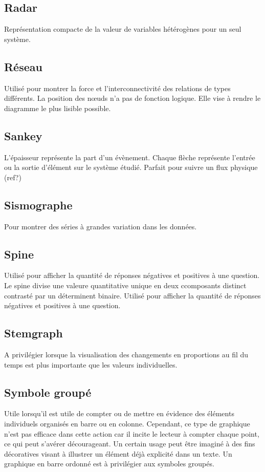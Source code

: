 \documentclass[a4paper,12pt]{article}
\begin{document}
\begin{multicols}{2}
\subsection*{Radar}
\label{sec:orgca13434}
Représentation compacte de la valeur de variables hétérogènes pour un seul système. \autocite{alansmithLexiqueVisuel}
\subsection*{Réseau}
\label{sec:org9e2b3ec}
Utilisé pour montrer la force et l'interconnectivité des relations de types différents. \autocite{alansmithLexiqueVisuel} La position des nœuds n’a pas de fonction logique. Elle vise à rendre le diagramme le plus lisible possible. \autocite{mikeyiHowChooseRight2020}
\subsection*{Sankey}
\label{sec:org9025f22}
L'épaisseur représente la part d'un évènement. Chaque flèche représente l'entrée ou la sortie d'élément sur le système étudié. \autocite{mikeyiHowChooseRight2020}  Parfait pour suivre un flux physique (ref?)
\subsection*{Sismographe}
\label{sec:orgc7cc294}
Pour montrer des séries à grandes variation dans les données. \autocite{alansmithLexiqueVisuel}
\subsection*{Spine}
\label{sec:orgb831ad0}
Utilisé pour afficher la quantité de réponses négatives et positives à une question. Le spine divise une valeure quantitative unique en deux ccomposants distinct contrasté par un déterminent binaire. \autocite{alansmithLexiqueVisuel} Utilisé pour afficher la quantité de réponses négatives et positives à une question.
\subsection*{Stemgraph}
\label{sec:org0853d72}
A privilégier lorsque la visualisation des changements en proportions au fil du temps est plus importante que les valeurs individuelles. \autocite{alansmithLexiqueVisuel}
\subsection*{Symbole groupé}
\label{sec:orgaeae827}
Utile lorsqu'il est utile de compter ou de mettre en évidence des éléments individuels organisés en barre ou en colonne. \autocite{alansmithLexiqueVisuel} Cependant, ce type de graphique n'est pas efficace dans cette action car il incite le lecteur à compter chaque point, ce qui peut s'avérer décourageant. \autocite{stephenfewSillyGraphsThat2012} Un certain usage peut être imaginé à des fins décoratives visant à illustrer un élément déjà explicité dans un texte. Un graphique en barre ordonné est à privilégier aux symboles groupés.

\end{multicols}
\end{document}
